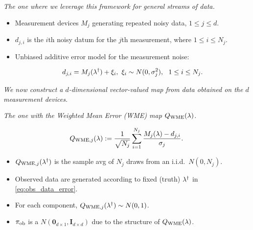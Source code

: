 \begin{frame}{\it The one where we leverage this framework for general streams of data.}

\begin{itemize}
  \item Measurement devices $M_j$ generating repeated noisy data, $1\leq j\leq d$.

  \bigskip
  \item $d_{j,i}$ is the $i$th noisy datum for the $j$th measurement, where $1\leq i\leq N_j$.

  \bigskip
  \item Unbiased additive error model for the measurement noise:

  \begin{equation}\label{eq:obs_data_error}
  	d_{j,i} = M_j(\paramref) + \xi_i, \ \xi_i\sim N(0,\sigma_j^2), \ \ 1\leq i\leq N_j.
  \end{equation}

\end{itemize}

\bigskip
\bigskip
\centering
{\it We now construct a $d$-dimensional vector-valued map from data obtained on the $d$ measurement devices.}

\end{frame}


\begin{frame}{\it The one with the Weighted Mean Error (WME) map $Q_\text{WME}(\lambda)$.}

\begin{equation}\label{eq:qoi_WME}
	Q_{\text{WME},j}(\lambda) := \frac{1}{\sqrt{N_j}} \sum_{i=1}^{N_j} \frac{M_j(\lambda)-d_{j,i}}{\sigma_j}.
\end{equation}

\bigskip
\begin{itemize}
  \item $Q_{\text{WME},j}(\lambda^\dagger)$ is the sample avg of $N_j$ draws from an i.i.d.~$N(0,N_j)$.

  \bigskip
  \item Observed data are generated according to fixed (truth) $\lambda^\dagger$ in \eqref{eq:obs_data_error}.

  \bigskip
  \item For each component, $Q_{\text{WME},j}(\lambda^\dagger) \sim N(0, 1)$.

  \bigskip
  \item $\operatorname*{\pi_{ob}}$ is a $N(\mathbf{0}_{d\times 1},\mathbf{I}_{d\times d})$ due to the structure of $Q_\text{WME}(\lambda)$.

\end{itemize}


\end{frame}


